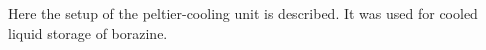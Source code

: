 Here the setup of the peltier-cooling unit is described. It was used for cooled liquid storage of borazine.